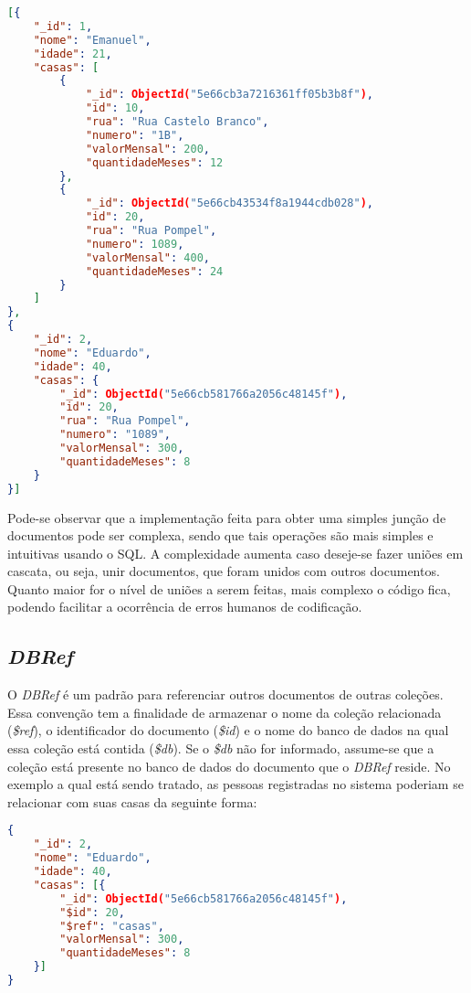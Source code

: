 \newpage

\begin{lstlisting}[language=json, caption={Junção de Documentos com \textit{\$lookup}}]
[{
    "_id": 1,
    "nome": "Emanuel",
    "idade": 21,
    "casas": [
        {
            "_id": ObjectId("5e66cb3a7216361ff05b3b8f"),
            "id": 10,
            "rua": "Rua Castelo Branco",
            "numero": "1B",
            "valorMensal": 200,
            "quantidadeMeses": 12
        },
        {
            "_id": ObjectId("5e66cb43534f8a1944cdb028"),
            "id": 20,
            "rua": "Rua Pompel",
            "numero": 1089,
            "valorMensal": 400,
            "quantidadeMeses": 24
        }
    ]
},
{
    "_id": 2,
    "nome": "Eduardo",
    "idade": 40,
    "casas": {
        "_id": ObjectId("5e66cb581766a2056c48145f"),
        "id": 20,
        "rua": "Rua Pompel",
        "numero": "1089",
        "valorMensal": 300,
        "quantidadeMeses": 8
    }
}]
\end{lstlisting}

Pode-se observar que a implementação feita para obter uma simples junção de documentos pode ser complexa, sendo que tais operações são mais simples e intuitivas usando o SQL. A complexidade aumenta caso deseje-se fazer uniões em cascata, ou seja, unir documentos, que foram unidos com outros documentos. Quanto maior for o nível de uniões a serem feitas, mais complexo o código fica, podendo facilitar a ocorrência de erros humanos de codificação.

\subsection{\textit{DBRef}}

O \textit{DBRef} é um padrão para referenciar outros documentos de outras coleções. Essa convenção tem a finalidade de armazenar o nome da coleção relacionada (\textit{\$ref}), o identificador do documento (\textit{\$id}) e o nome do banco de dados na qual essa coleção está contida (\textit{\$db}). Se o \textit{\$db} não for informado, assume-se que a coleção está presente no banco de dados do documento que o \textit{DBRef} reside. No exemplo a qual está sendo tratado, as pessoas registradas no sistema poderiam se relacionar com suas casas da seguinte forma:

\begin{lstlisting}[language=json, caption={Documento da Pessoa \textit{Eduardo}}]
{
    "_id": 2,
    "nome": "Eduardo",
    "idade": 40,
    "casas": [{
        "_id": ObjectId("5e66cb581766a2056c48145f"),
        "$id": 20,
        "$ref": "casas",
        "valorMensal": 300,
        "quantidadeMeses": 8
    }]
}
\end{lstlisting}


